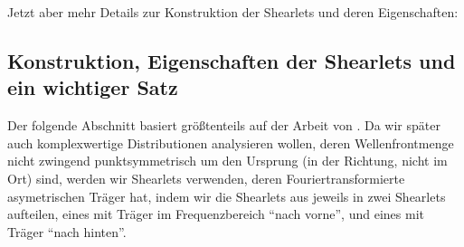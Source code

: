 Jetzt aber mehr Details zur Konstruktion der Shearlets und deren Eigenschaften:


\subsection{Konstruktion, Eigenschaften der Shearlets und ein wichtiger Satz} %
\label{sec:konstruktion_und_eigenschaften_der_shearlets}

Der folgende Abschnitt basiert größtenteils auf der Arbeit von \textcite{Kutyniok2008}.
 Da wir später auch komplexwertige Distributionen analysieren wollen, deren Wellenfrontmenge nicht zwingend punktsymmetrisch um den Ursprung (in der Richtung, nicht im Ort) sind, werden wir Shearlets verwenden, deren Fouriertransformierte asymetrischen Träger hat, indem wir die Shearlets aus \cite{Kutyniok2008} jeweils in zwei Shearlets aufteilen, eines mit Träger im Frequenzbereich "`nach vorne"', und eines mit Träger "`nach hinten"'.

